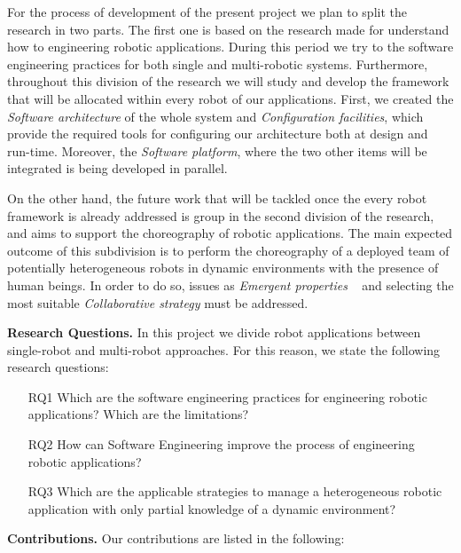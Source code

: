 For the process of development of the present project we plan to split the research in two parts.
The first one is based on the research made for understand how to engineering robotic applications.
During this period we try to the software engineering practices for both single and multi-robotic systems.
Furthermore, throughout this division of the research we will study and develop the framework that will be allocated within every robot of our applications.
First, we created the \emph{Software architecture} of the whole system and \emph{Configuration facilities}, which provide the required tools for configuring our architecture both at design and run-time.
Moreover, the \emph{Software platform}, where the two other items will be integrated is being developed in parallel.

On the other hand, the future work that will be tackled once the every robot framework is already addressed is group in the second division of the research, and aims to support the choreography of robotic applications.
The main expected outcome of this subdivision is to perform the choreography of a deployed team of potentially heterogeneous robots in dynamic environments with the presence of human beings.
In order to do so, issues as \emph{Emergent properties} ~\cite{DeAngelis2015,DeAngelis2016} and selecting the most suitable \emph{Collaborative strategy}  must be addressed.

\textbf{Research Questions.} 
In this project we divide robot applications between single-robot and multi-robot approaches.
For this reason, we state the following research questions:
\begin{itemize}
\item[RQ1] Which are the software engineering practices for engineering robotic applications? Which are the limitations?
\item[RQ2] How can Software Engineering improve the process of engineering robotic applications?
\item[RQ3] Which are the applicable strategies to manage a heterogeneous robotic application with only partial knowledge of a dynamic environment?
\end{itemize}

\textbf{Contributions.} 
Our contributions are listed in the following:

